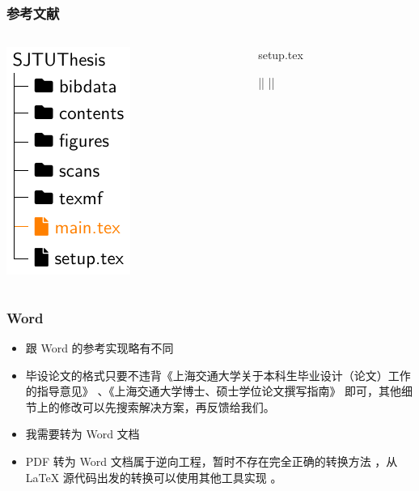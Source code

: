 \begin{frame}[fragile]
  \frametitle{参考文献}
  \begin{columns}
    \begin{column}{0.4\textwidth}
      \includegraphics[page=7]{support/figures/thesisdir.pdf}
    \end{column}
    \begin{column}{0.6\textwidth}
      \begin{codeblock}[firstnumber=111,numbersep=2pt]{setup.tex}
\usepackage[backend=biber,style=gb7714-2015]{biblatex}
\setlength{\bibitemsep}{0pt}
|\highlightline|%
|\highlightline|
      \end{codeblock}
    \end{column}
  \end{columns}
\end{frame}

\begin{frame}
  \frametitle{Word}
  \begin{itemize}
    \item[{\faQuestionCircle[regular]}] 跟 Word 的参考实现略有不同 
    \item[{\faCheckCircle[regular]}] 毕设论文的格式只要不违背《上海交通大学关于本科生毕业设计（论文）工作的指导意见》 、《上海交通大学博士、硕士学位论文撰写指南》  即可，其他细节上的修改可以先搜索解决方案，再反馈给我们。
    \item[{\faQuestionCircle[regular]}] 我需要转为 Word 文档
    \item[{\faCheckCircle[regular]}] PDF 转为 Word 文档属于逆向工程，暂时不存在完全正确的转换方法 ，从 \LaTeX{} 源代码出发的转换可以使用其他工具实现  。
  \end{itemize}
\end{frame}

